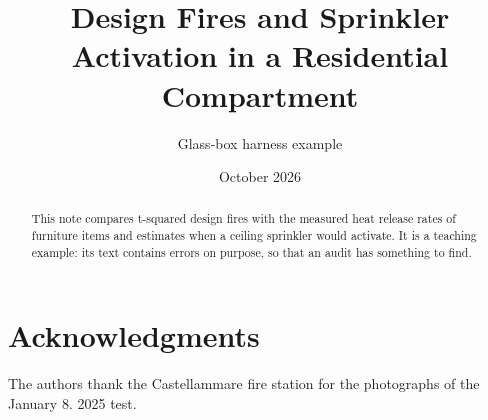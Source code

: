 \documentclass[11pt]{article}
\title{Design Fires and Sprinkler Activation in a Residential Compartment}
\author{Glass-box harness example}
\date{October 2026}
\begin{document}
\maketitle

\begin{abstract}
This note compares t-squared design fires with the measured heat release rates of furniture items and estimates when
a ceiling sprinkler would activate. It is a teaching example: its text contains errors on purpose, so that an audit
has something to find.
\end{abstract}

\tableofcontents





\section*{Acknowledgments}
The authors thank the Castellammare fire station for the photographs of the January 8. 2025 test.



\end{document}
